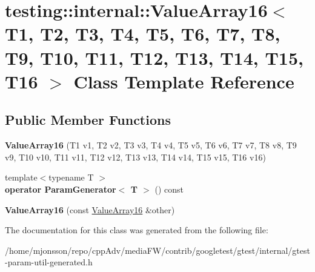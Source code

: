 \hypertarget{classtesting_1_1internal_1_1ValueArray16}{}\section{testing\+:\+:internal\+:\+:Value\+Array16$<$ T1, T2, T3, T4, T5, T6, T7, T8, T9, T10, T11, T12, T13, T14, T15, T16 $>$ Class Template Reference}
\label{classtesting_1_1internal_1_1ValueArray16}
\subsection*{Public Member Functions}
\begin{DoxyCompactItemize}
\item 
\mbox{\label{classtesting_1_1internal_1_1ValueArray16_ac12b3a15ab5418665a97b4a225438529}} 
{\bfseries Value\+Array16} (T1 v1, T2 v2, T3 v3, T4 v4, T5 v5, T6 v6, T7 v7, T8 v8, T9 v9, T10 v10, T11 v11, T12 v12, T13 v13, T14 v14, T15 v15, T16 v16)
\item 
\mbox{\label{classtesting_1_1internal_1_1ValueArray16_ae4f1174da079ca0d674497f5e452274c}} 
{\footnotesize template$<$typename T $>$ }\\{\bfseries operator Param\+Generator$<$ T $>$} () const
\item 
\mbox{\label{classtesting_1_1internal_1_1ValueArray16_a867f767c90905de55a8b4933881d144b}} 
{\bfseries Value\+Array16} (const \hyperlink{classtesting_1_1internal_1_1ValueArray16}{Value\+Array16} \&other)
\end{DoxyCompactItemize}


The documentation for this class was generated from the following file\+:\begin{DoxyCompactItemize}
\item 
/home/mjonsson/repo/cpp\+Adv/media\+F\+W/contrib/googletest/gtest/internal/gtest-\/param-\/util-\/generated.\+h\end{DoxyCompactItemize}

